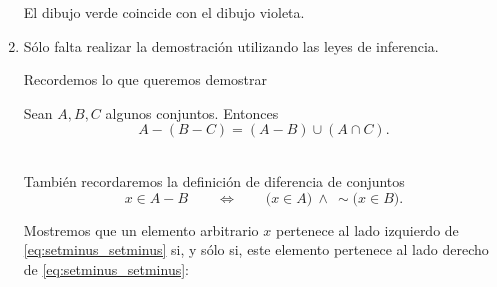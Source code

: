 \begin{enumerate}
\begin{dems}
\begin{center}
\end{center}
\begin{center}
\end{center} 
El dibujo verde coincide con el dibujo violeta. 
\end{dems}
\label{endlabel}

\item  Sólo falta realizar la demostración utilizando las leyes de
inferencia.

Recordemos lo que queremos demostrar

Sean $A,B,C$ algunos conjuntos. Entonces 
\begin{equation} \label{eq:setminus_setminus}
A -(B - C)=(A - B)\cup(A\cap C).
\end{equation}
\begin{dems}\\
También recordaremos la definición de diferencia de conjuntos 
\begin{equation} \label{eq:def_setminus} 
x\in A - B \qquad\Longleftrightarrow\qquad \bigl(x\in A\bigr)\ \wedge\ \sim\bigl(x\in B\bigr). 
\end{equation}

Mostremos que un elemento arbitrario $x$ pertenece al lado izquierdo
de \eqref{eq:setminus_setminus} si, y sólo si, este elemento pertenece
al lado derecho de \eqref{eq:setminus_setminus}:


\end{dems}
\end{enumerate}
